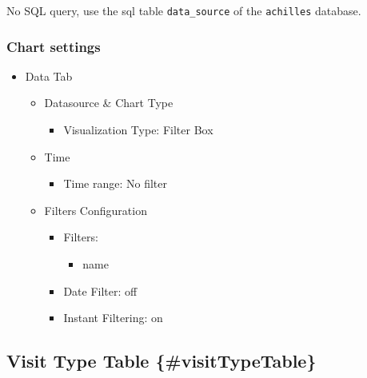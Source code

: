 \documentclass[
]{book}
\providecommand{\tightlist}{%
  \setlength{\itemsep}{0pt}\setlength{\parskip}{0pt}}
\begin{document}
No SQL query, use the sql table \texttt{data\_source} of the \texttt{achilles} database.

\hypertarget{chart-settings-16}{%
\subsubsection*{Chart settings}\label{chart-settings-16}}

\begin{itemize}
\tightlist
\item
  Data Tab

  \begin{itemize}
  \tightlist
  \item
    Datasource \& Chart Type

    \begin{itemize}
    \tightlist
    \item
      Visualization Type: Filter Box
    \end{itemize}
  \item
    Time

    \begin{itemize}
    \tightlist
    \item
      Time range: No filter
    \end{itemize}
  \item
    Filters Configuration

    \begin{itemize}
    \tightlist
    \item
      Filters:

      \begin{itemize}
      \tightlist
      \item
        name
      \end{itemize}
    \item
      Date Filter: off
    \item
      Instant Filtering: on
    \end{itemize}
  \end{itemize}
\end{itemize}

\hypertarget{visit-type-table-visittypetable}{%
\subsection*{Visit Type Table \{\#visitTypeTable\}}\label{visit-type-table-visittypetable}}
\end{document}
